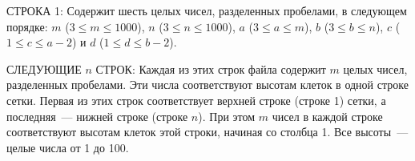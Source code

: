 СТРОКА 1: Содержит шесть целых чисел, разделенных
пробелами, в следующем порядке: $m$ ($3 \le m \le 1000$), $n$ ($3 \le n \le 1000$), $a$ ($3 \le a \le m$),
$b$ ($3 \le b \le n$), $c$ ($1 \le c \le a - 2$) и $d$ ($1 \le d \le b-2$).


СЛЕДУЮЩИЕ $n$ СТРОК: Каждая из этих строк файла содержит $m$
целых чисел, разделенных пробелами. Эти числа
соответствуют высотам клеток в одной строке сетки. Первая
из этих строк соответствует верхней строке (строке 1) сетки,
а последняя~--- нижней строке (строке $n$). При этом $m$ чисел в
каждой строке соответствуют высотам клеток этой строки,
начиная со столбца 1. Все высоты~--- целые числа от 1 до 100. 